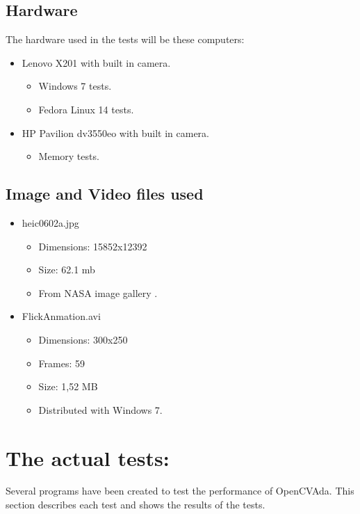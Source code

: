 \subsection{Hardware}
The hardware used in the tests will be these computers:
\begin{itemize}
\item Lenovo X201 with built in camera.
\begin{itemize}
\item Windows 7 tests.
\item Fedora Linux 14 tests.
\end{itemize}
\item HP Pavilion dv3550eo with built in camera.
\begin{itemize}
\item Memory tests.
\end{itemize}
\end{itemize}
\subsection{Image and Video files used}
\begin{itemize}
\item heic0602a.jpg
\begin{itemize}
\item Dimensions: 15852x12392
\item Size: 62.1 mb
\item From NASA image gallery \cite{nasa}.
\end{itemize}
\item FlickAnmation.avi
\begin{itemize}
\item Dimensions: 300x250
\item Frames: 59
\item Size: 1,52 MB
\item Distributed with Windows 7.
\end{itemize}
\end{itemize}
\section{The actual tests:}
Several programs have been created to test the performance of OpenCVAda. This section describes each test and shows the results of the tests.
